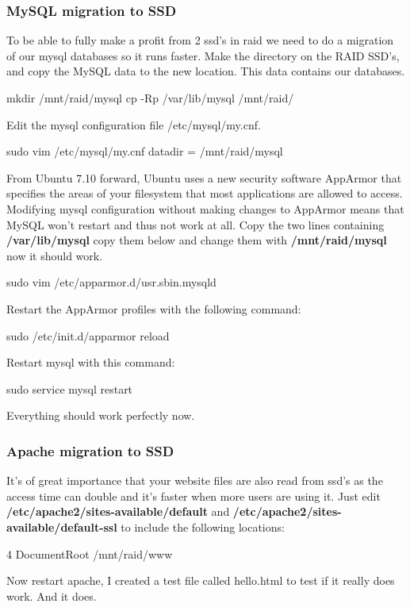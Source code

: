 \subsubsection{MySQL migration to SSD}
To be able to fully make a profit from 2 \gls{ssd}'s in \gls{raid} we need to do a migration of our \gls{mysql} databases so it runs faster.
Make the directory on the RAID SSD's, and copy the MySQL data to the new location. This data contains our databases.
\begin{codelisting}
mkdir /mnt/raid/mysql
cp -Rp /var/lib/mysql /mnt/raid/
\end{codelisting}

Edit the \gls{mysql} configuration file /etc/mysql/my.cnf.
\begin{codelisting}
	sudo vim /etc/mysql/my.cnf
datadir 		= /mnt/raid/mysql
\end{codelisting}

From Ubuntu 7.10 forward, Ubuntu uses a new security software AppArmor that specifies the areas of your filesystem that most applications are allowed to access. Modifying \gls{mysql} configuration without making changes to AppArmor means that MySQL won't restart and thus not work at all. Copy the two lines containing \textbf{/var/lib/mysql} copy them below and change them with \textbf{/mnt/raid/mysql} now it should work.
\begin{codelisting}
	sudo vim /etc/apparmor.d/usr.sbin.mysqld
\end{codelisting}

Restart the AppArmor profiles with the following command:
\begin{codelisting}
	sudo /etc/init.d/apparmor reload
\end{codelisting}

Restart \gls{mysql} with this command:
\begin{codelisting}
	sudo service mysql restart
\end{codelisting}
Everything should work perfectly now.

\subsubsection{Apache migration to SSD}
It's of great importance that your website files are also read from \gls{ssd}'s as the access time can double and it's faster when more users are using it.
Just edit \textbf{/etc/apache2/sites-available/default} and  \textbf{/etc/apache2/sites-available/default-ssl} to include the following locations: 
\begin{codelisting}
4	DocumentRoot /mnt/raid/www
\end{codelisting}
Now restart apache, I created a test file called hello.html to test if it really does work. And it does.

